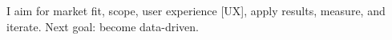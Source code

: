
I aim for market fit, scope, user experience %
{\scriptsize[UX]}, apply results, measure, and iterate.
Next goal: become data-driven.


%
 
% 
% 
% 
% 


